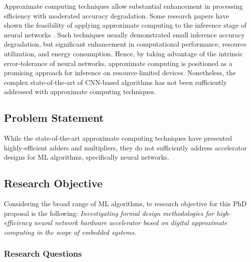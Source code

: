 Approximate computing techniques allow substantial enhancement in processing efficiency with moderated accuracy degradation. Some research papers have shown the feasibility of applying approximate computing to the inference stage of neural networks \cite{lotrivc2012applicability, han2013approximate, du2014leveraging, mrazek2016design, sarwar2016multiplier, zervakis2021approximate}. Such techniques usually demonstrated small inference accuracy degradation, but significant enhancement in computational performance, resource utilization, and energy consumption. Hence, by taking advantage of the intrinsic error-tolerance of neural networks, approximate computing is positioned as a promising approach for inference on resource-limited devices. Nonetheless, the complex  state-of-the-art of CNN-based algorithms has not been sufficiently addressed with approximate computing techniques.


\subsection{Problem Statement}

While the state-of-the-art approximate computing techniques have presented highly-efficient adders and multipliers, they do not sufficiently address accelerator designs for ML algorithms, specifically neural networks.

\subsection{Research Objective}
Considering the broad range of ML algorithms, te research objective for this PhD proposal is the following: \emph{Investigating formal design methodologies for high-efficiency neural network hardware accelerator based on digital approximate computing in the scope of embedded systems.}

\subsubsection{Research Questions}

